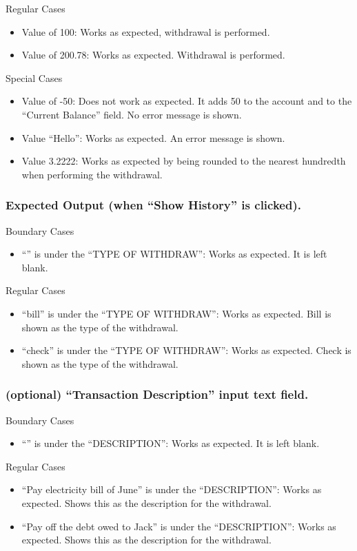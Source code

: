 \documentclass[12pt]{article}
\begin{document}
Regular Cases
\begin{itemize}
  \item Value of 100: Works as expected, withdrawal is performed.
  \item Value of 200.78: Works as expected. Withdrawal is performed.
\end{itemize}

Special Cases
\begin{itemize}
  \item Value of -50: Does not work as expected.  It adds 50 to the account and to the ``Current Balance'' field. No error message is shown.
  \item Value ``Hello'': Works as expected. An error message is shown.
  \item Value 3.2222: Works as expected by being rounded to the nearest hundredth when performing the withdrawal. 
\end{itemize}

\subsubsection{Expected Output (when ``Show History'' is clicked).}

Boundary Cases
\begin{itemize}
  \item ``'' is under the ``TYPE OF WITHDRAW'': Works as expected. It is left blank.
\end{itemize}

Regular Cases
\begin{itemize}
  \item ``bill'' is under the ``TYPE OF WITHDRAW'': Works as expected. Bill is shown as the type of the withdrawal.
  \item ``check'' is under the ``TYPE OF WITHDRAW'': Works as expected. Check is shown as the type of the withdrawal.
\end{itemize}

\subsubsection{(optional) ``Transaction Description'' input text field.}

Boundary Cases
\begin{itemize}
  \item ``'' is under the ``DESCRIPTION'': Works as expected. It is left blank.
\end{itemize}

Regular Cases
\begin{itemize}
  \item  ``Pay electricity bill of June'' is under the ``DESCRIPTION'': Works as expected. Shows this as the description for the withdrawal.
  \item  ``Pay off the debt owed to Jack'' is under the ``DESCRIPTION'': Works as expected. Shows this as the description for the withdrawal.
\end{itemize}
\end{document}
